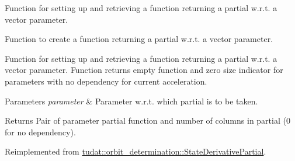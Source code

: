 Function for setting up and retrieving a function returning a partial w.\+r.\+t. a vector parameter. 

Function to create a function returning a partial w.\+r.\+t. a vector parameter.

Function for setting up and retrieving a function returning a partial w.\+r.\+t. a vector parameter. Function returns empty function and zero size indicator for parameters with no dependency for current acceleration. 
\begin{DoxyParams}{Parameters}
{\em parameter} & Parameter w.\+r.\+t. which partial is to be taken. \\
\hline
\end{DoxyParams}
\begin{DoxyReturn}{Returns}
Pair of parameter partial function and number of columns in partial (0 for no dependency). 
\end{DoxyReturn}


Reimplemented from \hyperlink{classtudat_1_1orbit__determination_1_1StateDerivativePartial_a89ee84b266831bc4aa563f22c4afacb5}{tudat\+::orbit\+\_\+determination\+::\+State\+Derivative\+Partial}.

